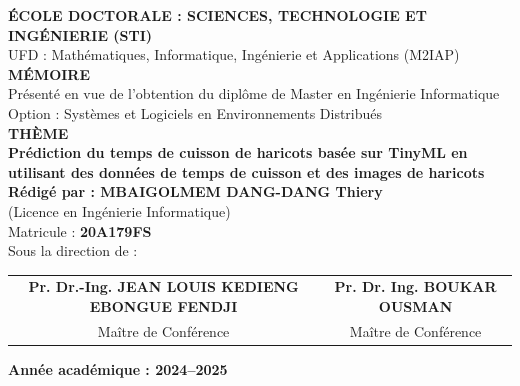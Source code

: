 \begin{center}
	{\bfseries ÉCOLE DOCTORALE : SCIENCES, TECHNOLOGIE ET INGÉNIERIE (STI)} \\[0.2cm]
	UFD : Mathématiques, Informatique, Ingénierie et Applications (M2IAP) \\[1cm]

	{\bfseries MÉMOIRE} \\[0.3cm]
	Présenté en vue de l'obtention du diplôme de Master en Ingénierie Informatique \\
	Option : Systèmes et Logiciels en Environnements Distribués \\[0.8cm]

	{\bfseries THÈME} \\[0.25cm]
	\textcolor{blue!70!black}{\textbf{Prédiction du temps de cuisson de haricots basée sur TinyML en utilisant des données de temps de cuisson et des images de haricots}} \\[1.2cm]

	{\bfseries Rédigé par : MBAIGOLMEM DANG-DANG Thiery} \\
	(Licence en Ingénierie Informatique) \\
	Matricule : \textbf{20A179FS} \\[0.8cm]

	Sous la direction de : \\[0.8cm]

	\begin{tabular}{cc}
    \parbox[c]{0.45\linewidth}{\centering \textbf{Pr. Dr.-Ing. JEAN LOUIS KEDIENG EBONGUE FENDJI}} &
    \parbox[c]{0.45\linewidth}{\centering \textbf{Pr. Dr. Ing. BOUKAR OUSMAN}} \\[0.5cm]
    \parbox[c]{0.45\linewidth}{\centering Maître de Conférence} &
    \parbox[c]{0.45\linewidth}{\centering Maître de Conférence}
\end{tabular}

\end{center}

\vfill

\begin{center}
	{\bfseries   \textbf{Année académique : 2024--2025} }
\end{center}
